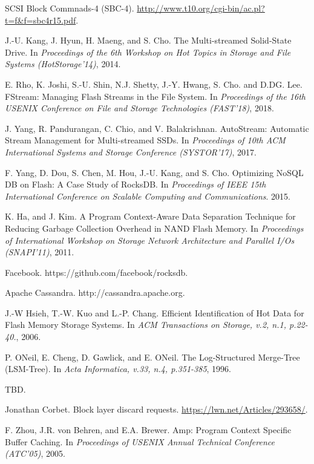 

\begin{thebibliography}{00}

SCSI Block Commnads-4 (SBC-4).
\url{http://www.t10.org/cgi-bin/ac.pl?t=f&f=sbc4r15.pdf}.

J.-U. Kang, J. Hyun, H. Maeng, and S. Cho. The Multi-streamed Solid-State Drive.
In \textit{Proceedings of the 6th Workshop on Hot Topics in Storage and File Systems (HotStorage'14)}, 2014.


E. Rho, K. Joshi, S.-U. Shin, N.J. Shetty, J.-Y. Hwang, S. Cho. and D.DG. Lee. 
FStream: Managing Flash Streams in the File System.
In \textit{Proceedings of the 16th USENIX Conference on File and Storage Technologies (FAST'18)}, 2018.

J. Yang, R. Pandurangan, C. Chio, and V. Balakrishnan.
AutoStream: Automatic Stream Management for Multi-streamed SSDs.
In \textit{Proceedings of 10th ACM International Systems and Storage Conference (SYSTOR'17)}, 2017.

F. Yang, D. Dou, S. Chen, M. Hou, J.-U. Kang, and S. Cho.
Optimizing NoSQL DB on Flash: A Case Study of RocksDB.
In \textit{Proceedings of IEEE 15th International Conference on Scalable Computing
and Communications}. 2015.

K. Ha, and J. Kim.
A Program Context-Aware Data Separation Technique for Reducing Garbage Collection Overhead in NAND Flash Memory.
In \textit{Proceedings of International Workshop on Storage Network Architecture 
and Parallel I/Os (SNAPI'11)}, 2011.

Facebook. https://github.com/facebook/rocksdb.

Apache Cassandra. http://cassandra.apache.org.

J.-W Hsieh, T.-W. Kuo and L.-P. Chang.
Efficient Identification of Hot Data for Flash Memory Storage Systems.
In \textit{ACM Transactions on Storage, v.2, n.1, p.22-40.}, 2006.

P. ONeil, E. Cheng, D. Gawlick, and E. ONeil.
The Log-Structured Merge-Tree (LSM-Tree).
In \textit{Acta Informatica, v.33, n.4, p.351-385}, 1996.

TBD.

Jonathan Corbet.
Block layer discard requests.
\url{https://lwn.net/Articles/293658/}.


F. Zhou, J.R. von Behren, and E.A. Brewer.
Amp: Program Context Specific Buffer Caching.
In \textit{Proceedings of USENIX Annual Technical Conference (ATC'05)}, 2005.



\end{thebibliography}
